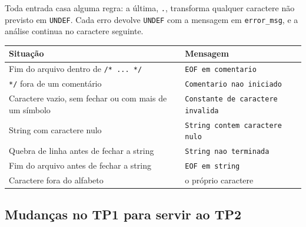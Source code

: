 \documentclass[11pt,a4paper]{article}
\begin{document}
Toda entrada casa alguma regra: a última, \texttt{.}, transforma qualquer caractere não previsto
em \texttt{UNDEF}. Cada erro devolve \texttt{UNDEF} com a mensagem em \texttt{error\_msg}, e a
análise continua no caractere seguinte.

\begin{center}
\begin{tabular}{@{}ll@{}}
\toprule
Situação & Mensagem \\
\midrule
Fim do arquivo dentro de \texttt{/* ... */} & \texttt{EOF em comentario} \\
\texttt{*/} fora de um comentário & \texttt{Comentario nao iniciado} \\
Caractere vazio, sem fechar ou com mais de um símbolo & \texttt{Constante de caractere invalida} \\
String com caractere nulo & \texttt{String contem caractere nulo} \\
Quebra de linha antes de fechar a string & \texttt{String nao terminada} \\
Fim do arquivo antes de fechar a string & \texttt{EOF em string} \\
Caractere fora do alfabeto & o próprio caractere \\
\bottomrule
\end{tabular}
\end{center}

\subsection{Mudanças no TP1 para servir ao TP2}
\end{document}
